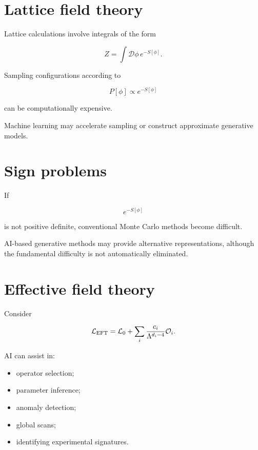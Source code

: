 \documentclass[11pt,a4paper,oneside]{book}
\begin{document}
\section{Lattice field theory}

Lattice calculations involve integrals of the form

\begin{equation}
Z
=
\int\mathcal{D}\phi\,
e^{-S[\phi]}.
\end{equation}

Sampling configurations according to

\begin{equation}
P[\phi]
\propto
e^{-S[\phi]}
\end{equation}

can be computationally expensive.

Machine learning may accelerate sampling or construct approximate generative
models.

\section{Sign problems}

If

\begin{equation}
e^{-S[\phi]}
\end{equation}

is not positive definite, conventional Monte Carlo methods become difficult.

AI-based generative methods may provide alternative representations, although
the fundamental difficulty is not automatically eliminated.

\section{Effective field theory}

Consider

\begin{equation}
\mathcal{L}_{\rm EFT}
=
\mathcal{L}_0
+
\sum_i
\frac{c_i}{\Lambda^{d_i-4}}
\mathcal{O}_i.
\end{equation}

AI can assist in:

\begin{itemize}
\item operator selection;
\item parameter inference;
\item anomaly detection;
\item global scans;
\item identifying experimental signatures.
\end{itemize}
\end{document}
